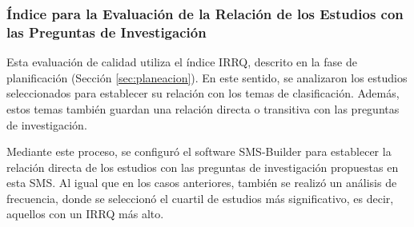 \subsubsection{Índice para la Evaluación de la Relación de los Estudios con las Preguntas de Investigación}
Esta evaluación de calidad utiliza el índice IRRQ, descrito en la fase de planificación (Sección \ref{sec:planeacion}). En este sentido, se analizaron los estudios seleccionados para establecer su relación con los temas de clasificación. Además, estos temas también guardan una relación directa o transitiva con las preguntas de investigación.

Mediante este proceso, se configuró el software SMS-Builder \cite{sms-builder-repo} para establecer la relación directa de los estudios con las preguntas de investigación propuestas en esta SMS. Al igual que en los casos anteriores, también se realizó un análisis de frecuencia, donde se seleccionó el cuartil de estudios más significativo, es decir, aquellos con un IRRQ más alto.
